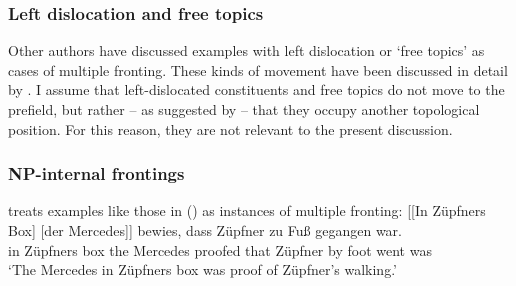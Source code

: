 




\subsubsection{Left dislocation and free topics}
\label{sec-left-dislocation-hanging-topic}
              
Other authors have discussed examples with left dislocation or `free topics' as cases of multiple
fronting. These kinds of movement
have been discussed in detail by \citet{Altmann81a}. I assume that left-dislocated constituents and free topics do not move to the
prefield, but rather -- as suggested by \citet[]{Hoehle86} -- that they occupy another topological position. For this reason,
they are not relevant to the present discussion.

\subsubsection{NP-internal frontings}
\label{sec-np-internal-frontings}


\citet[]{Speyer2008a} treats examples like those in () as instances of multiple fronting:
\ea
\label{ex-inzuepfners-box-der-mercedes}
\gll {}[[In Züpfners Box] [der Mercedes]] bewies, dass Züpfner zu Fuß gegangen war.\footnotemark\\
       \hspaceThis{[[}in Züpfners box \spacebr{}the Mercedes proofed that Züpfner by foot went was\\
\glt `The Mercedes in Züpfners box was proof of Züpfner's walking.'
\z

